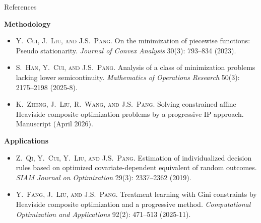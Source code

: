 \documentclass[aspectratio=169,xcolor=dvipsnames]{beamer}
\begin{document}
\begin{frame}{References}
  \footnotesize
  \setlength{\parskip}{0pt}

  {\color{MediumRed}\bfseries Methodology}
  \vspace{0.04cm}
  \begin{itemize}
    \setlength{\itemsep}{0.08cm}
    \item Y.~\textsc{Cui}, J.~\textsc{Liu}, \textsc{and} J.S.~\textsc{Pang}.
      On the minimization of piecewise functions: Pseudo stationarity.
      \textit{Journal of Convex Analysis} 30(3): 793--834 (2023).
    \item S.~\textsc{Han}, Y.~\textsc{Cui}, \textsc{and} J.S.~\textsc{Pang}.
      Analysis of a class of minimization problems lacking lower
      semicontinuity. \textit{Mathematics of Operations Research}
      50(3): 2175--2198 (2025-8).
    \item K.~\textsc{Zheng}, J.~\textsc{Liu}, R.~\textsc{Wang}, \textsc{and}
      J.S.~\textsc{Pang}. Solving constrained affine Heaviside composite
      optimization problems by a progressive IP approach.
      Manuscript (April 2026).
  \end{itemize}

  \vspace{0.20cm}
  {\color{MediumRed}\bfseries Applications}
  \vspace{0.04cm}
  \begin{itemize}
    \setlength{\itemsep}{0.08cm}
    \item Z.~\textsc{Qi}, Y.~\textsc{Cui}, Y.~\textsc{Liu}, \textsc{and}
      J.S.~\textsc{Pang}. Estimation of individualized decision rules based on
      optimized covariate-dependent equivalent of random outcomes.
      \textit{SIAM Journal on Optimization} 29(3): 2337--2362 (2019).
    \item Y.~\textsc{Fang}, J.~\textsc{Liu}, \textsc{and} J.S.~\textsc{Pang}.
      Treatment learning with Gini constraints by Heaviside composite
      optimization and a progressive method.
      \textit{Computational Optimization and Applications}
      92(2): 471--513 (2025-11).
  \end{itemize}
\end{frame}
\end{document}
